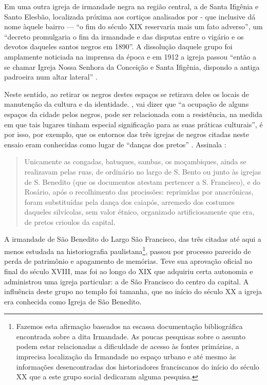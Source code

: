 \begin{refsection}
    Em uma outra igreja de irmandade negra na região central, a de Santa Ifigênia e Santo Elesbão, localizada próxima aos cortiços analisados por \textcite{Bresciani2010Sanitarismo} - que inclusive dá nome àquele bairro --- ``o fim do século XIX reservaria mais um fato adverso'', um ``decreto promulgaria o fim da irmandade e das disputas entre o vigário e os devotos daqueles santos negros em 1890''. A dissolução daquele grupo foi amplamente noticiada na imprensa da época e em 1912 a igreja passou ``então a se chamar Igreja Nossa Senhora da Conceição e Santa Ifigênia, dispondo a antiga padroeira num altar lateral'' \cite{Santos2020Igrejas}.

    Neste sentido, ao retirar os negros destes espaços se retirava deles os locais de manutenção da cultura e da identidade. \textcite{Bertin2010Sociabilidade}, vai dizer que ``a ocupação de alguns espaços da cidade pelos negros, pode ser relacionada com a resistência, na medida em que tais lugares tinham especial significação para as suas práticas culturais'', é por isso, por exemplo, que os entornos das três igrejas de negros citadas neste ensaio eram conhecidas como lugar de ``danças dos pretos'' \cite[p.~128]{Bertin2010Sociabilidade}. Assinala \cite{Santos1998NemTudo}:

    \begin{quotation}
        Unicamente as congadas, batuques, sambas, os moçambiques, ainda se realizavam pelas ruas, de ordinário no largo de S. Bento ou junto às igrejas de S. Benedito (que os documentos atestam pertencer a S. Francisco), e do Rosário, após o recolhimento das procissões: reprimidas por anacrônicas, foram substituídas pela dança dos caiapós, arremedo dos costumes daqueles silvícolas, sem valor étnico, organizado artificiosamente que era, de pretos crioulos da capital. \cite[p.~124]{Santos1998NemTudo} 
    \end{quotation}

    A irmandade de São Benedito do Largo São Francisco, das três citadas até aqui a menos estudada na historiografia paulistana\footnote{Fazemos esta afirmação baseados na escassa documentação bibliográfica encontrada sobre a dita Irmandade. As poucas pesquisas sobre o assunto podem estar relacionadas a dificuldade de acesso às fontes primárias, a imprecisa localização da Irmandade no espaço urbano e até mesmo às informações desencontradas dos historiadores franciscanos do início do século XX que a este grupo social dedicaram alguma pesquisa.}, passou por processo parecido de perda de patrimônio e apagamento de memórias. Teve sua aprovação oficial no final do século XVIII, mas foi ao longo do XIX que adquiriu certa autonomia e administrou uma igreja particular: a de São Francisco do centro da capital. A influência deste grupo no templo foi tamanha, que no início do século XX a igreja era conhecida como Igreja de São Benedito. 
    

\end{refsection}
